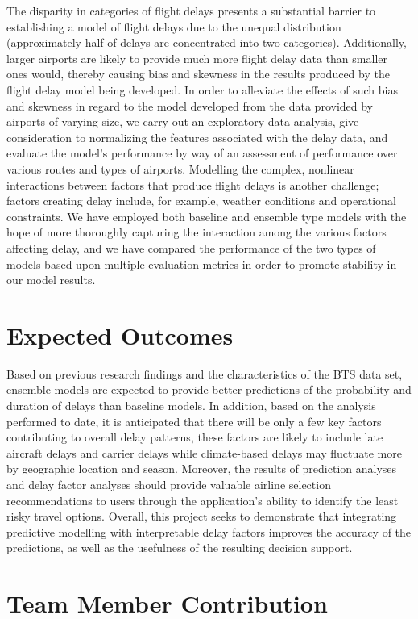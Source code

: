 The disparity in categories of flight delays presents a substantial barrier to establishing a model of flight delays due to the unequal distribution (approximately half of delays are concentrated into two categories). Additionally, larger airports are likely to provide much more flight delay data than smaller ones would, thereby causing bias and skewness in the results produced by the flight delay model being developed. In order to alleviate the effects of such bias and skewness in regard to the model developed from the data provided by airports of varying size, we carry out an exploratory data analysis, give consideration to normalizing the features associated with the delay data, and evaluate the model’s performance by way of an assessment of performance over various routes and types of airports. Modelling the complex, nonlinear interactions between factors that produce flight delays is another challenge; factors creating delay include, for example, weather conditions and operational constraints. We have employed both baseline and ensemble type models with the hope of more thoroughly capturing the interaction among the various factors affecting delay, and we have compared the performance of the two types of models based upon multiple evaluation metrics in order to promote stability in our model results.


\section{Expected Outcomes }

Based on previous research findings and the characteristics of the BTS data set, ensemble models are expected to provide better predictions of the probability and duration of delays than baseline models. In addition, based on the analysis performed to date, it is anticipated that there will be only a few key factors contributing to overall delay patterns, these factors are likely to include late aircraft delays and carrier delays while climate-based delays may fluctuate more by geographic location and season. Moreover, the results of prediction analyses and delay factor analyses should provide valuable airline selection recommendations to users through the application's ability to identify the least risky travel options. Overall, this project seeks to demonstrate that integrating predictive modelling with interpretable delay factors improves the accuracy of the predictions, as well as the usefulness of the resulting decision support.

\section{Team Member Contribution}


